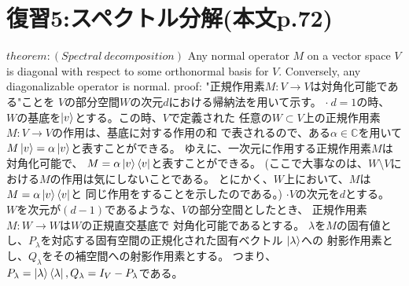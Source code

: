 \section{\Large 復習5:スペクトル分解(本文p.72)}
$theorem :(Spectral~decomposition)$
Any normal operator $M$ on a vector space $V$ is
diagonal with respect to some orthonormal basis for $V$.
Conversely, any diagonalizable operator is normal.
\newline
{\large proof:}
"正規作用素$M:V \rightarrow V$は対角化可能である"ことを
$V$の部分空間$W$の次元$d$における帰納法を用いて示す。
\newline
$\cdot ~d = 1$の時、
$W$の基底を$\ket{v}$とする。この時、$V$で定義された
任意の$W \subset V$上の正規作用素
$M:V \rightarrow V$の作用は、基底に対する作用の和
で表されるので、ある$\alpha \in \mathbb{C}$を用いて
$M\ket{v} = \alpha \ket{v}$と表すことができる。
ゆえに、一次元に作用する正規作用素$M$は対角化可能で、
$M = \alpha \ket{v}\bra{v}$と表すことができる。
(ここで大事なのは、$W \setminus V$における$M$の作用は気にしないことである。
とにかく、$W$上において、$M$は$M = \alpha \ket{v}\bra{v}$と
同じ作用をすることを示したのである。)
\newline
$\cdot Vの次元をdとする。$
$W$を次元が$(d - 1)$であるような、$V$の部分空間としたとき、
正規作用素$M:W \rightarrow W$は$W$の正規直交基底で
対角化可能であるとする。
$\lambda$を$M$の固有値とし、$P_\lambda $を対応する固有空間の正規化された固有ベクトル
$\ket{\lambda}$への
射影作用素とし、$Q_\lambda $をその補空間への射影作用素とする。
つまり、$P_\lambda  = \ket{\lambda} \bra{\lambda}, Q_\lambda  = I_V - P_\lambda $である。

